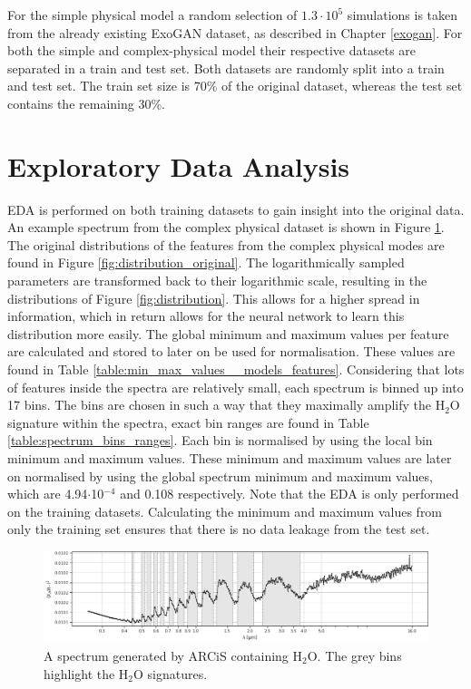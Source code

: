 For the simple physical model a random selection of $1.3 \cdot 10^5$ simulations is taken from the already existing ExoGAN dataset, as described in Chapter \ref{exogan}. For both the simple and complex-physical model their respective datasets are separated in a train and test set. Both datasets are randomly split into a train and test set. The train set size is 70\% of the original dataset, whereas the test set contains the remaining 30\%.





\section{Exploratory Data Analysis} \label{eda}
EDA is performed on both training datasets to gain insight into the original data. An example spectrum from the complex physical dataset is shown in Figure \ref{fig:h2obins}. The original distributions of the features from the complex physical modes are found in Figure \ref{fig:distribution_original}. The logarithmically sampled parameters are transformed back to their logarithmic scale, resulting in the distributions of Figure \ref{fig:distribution}. This allows for a higher spread in information, which in return allows for the neural network to learn this distribution more easily. The global minimum and maximum values per feature are calculated and stored to later on be used for normalisation. These values are found in Table \ref{table:min_max_values__models_features}. Considering that lots of features inside the spectra are relatively small, each spectrum is binned up into 17 bins. The bins are chosen in such a way that they maximally amplify the $\mathrm{H_2O}$ signature within the spectra, exact bin ranges are found in Table \ref{table:spectrum_bins_ranges}. Each bin is normalised by using the local bin minimum and maximum values. These minimum and maximum values are later on normalised by using the global spectrum minimum and maximum values, which are 4.94$\cdot$10$^{-4}$ and 0.108 respectively. Note that the EDA is only performed on the training datasets. Calculating the minimum and maximum values from only the training set ensures that there is no data leakage from the test set.

\begin{figure} [!htb]
    \centering
    \includegraphics[scale=0.4]{figuren/H2O bins.png}
    \caption{A spectrum generated by ARCiS containing $\mathrm{H_2O}$. The grey bins highlight the H$_2$O signatures.}
    \label{fig:h2obins}
\end{figure}

